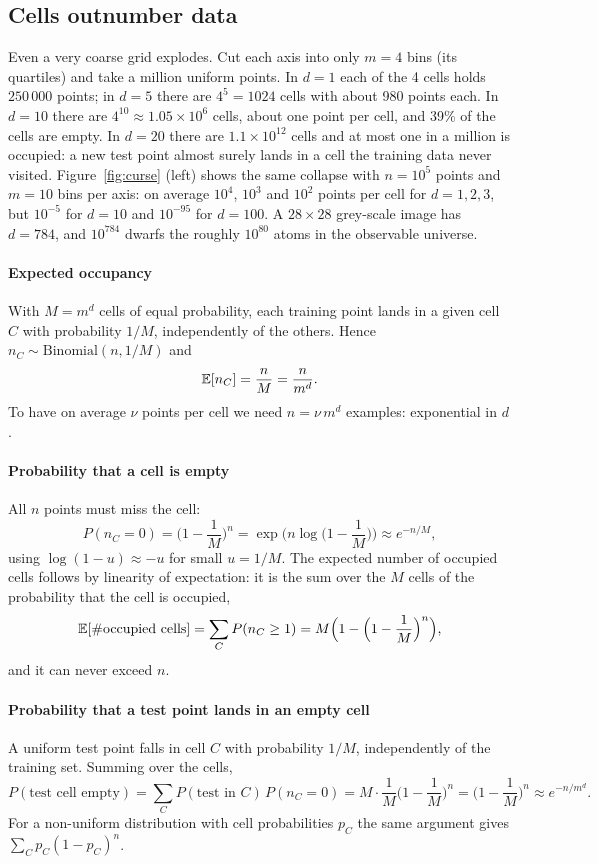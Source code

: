 \documentclass[11pt]{article}
\begin{document}
\subsection{Cells outnumber data}\label{sec:cells}

Even a very coarse grid explodes. Cut each axis into only $m = 4$ bins (its quartiles) and take a million uniform
points. In $d = 1$ each of the 4 cells holds $250\,000$ points; in $d = 5$ there are $4^5 = 1024$ cells with about 980
points each. In $d = 10$ there are $4^{10} \approx 1.05 \times 10^6$ cells, about one point per cell, and 39\% of the
cells are empty. In $d = 20$ there are $1.1 \times 10^{12}$ cells and at most one in a million is occupied: a new test
point almost surely lands in a cell the training data never visited. Figure~\ref{fig:curse} (left) shows the same
collapse with $n = 10^5$ points and $m = 10$ bins per axis: on average $10^4$, $10^3$ and $10^2$ points per cell for
$d = 1, 2, 3$, but $10^{-5}$ for $d = 10$ and $10^{-95}$ for $d = 100$. A $28 \times 28$ grey-scale image has
$d = 784$, and $10^{784}$ dwarfs the roughly $10^{80}$ atoms in the observable universe.

\paragraph{Expected occupancy} With $M = m^d$ cells of equal probability, each training point lands in a given cell
$C$ with probability $1/M$, independently of the others. Hence $n_C \sim \mathrm{Binomial}(n, 1/M)$ and
\[
  \mathbb{E}[n_C] = \frac{n}{M} = \frac{n}{m^d} .
\]
To have on average $\nu$ points per cell we need $n = \nu\, m^d$ examples: exponential in $d$.

\paragraph{Probability that a cell is empty} All $n$ points must miss the cell:
\[
  P(n_C = 0) = \Big(1 - \frac{1}{M}\Big)^n = \exp\Big(n \log\Big(1 - \frac{1}{M}\Big)\Big) \approx e^{-n/M},
\]
using $\log(1 - u) \approx -u$ for small $u = 1/M$. The expected number of occupied cells follows by linearity
of expectation: it is the sum over the $M$ cells of the probability that the cell is occupied,
\[
  \mathbb{E}[\#\text{occupied cells}] = \sum_C P(n_C \ge 1) = M \Big(1 - \Big(1 - \frac{1}{M}\Big)^n\Big),
\]
and it can never exceed $n$.

\paragraph{Probability that a test point lands in an empty cell} A uniform test point falls in cell $C$ with
probability $1/M$, independently of the training set. Summing over the cells,
\[
  P(\text{test cell empty}) = \sum_C P(\text{test in } C)\, P(n_C = 0) = M \cdot \frac{1}{M} \Big(1 - \frac{1}{M}\Big)^n
  = \Big(1 - \frac{1}{M}\Big)^n \approx e^{-n/m^d} .
\]
For a non-uniform distribution with cell probabilities $p_C$ the same argument gives
$\sum_C p_C (1 - p_C)^n$.
\end{document}
